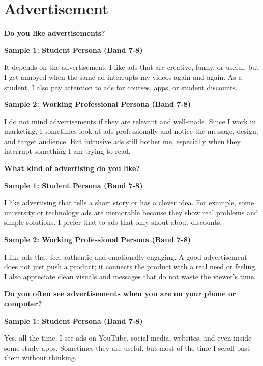 \newpage

\section{Advertisement}
\begin{ieltsquestion}
\textbf{Do you like advertisements?}
\end{ieltsquestion}
\textbf{Sample 1: Student Persona (Band 7-8)}

It depends on the advertisement. I like ads that are creative, funny, or useful, but I get annoyed when the same ad interrupts my videos again and again. As a student, I also pay attention to ads for courses, apps, or student discounts.

\textbf{Sample 2: Working Professional Persona (Band 7-8)}

I do not mind advertisements if they are relevant and well-made. Since I work in marketing, I sometimes look at ads professionally and notice the message, design, and target audience. But intrusive ads still bother me, especially when they interrupt something I am trying to read.

\separator

\begin{ieltsquestion}
\textbf{What kind of advertising do you like?}
\end{ieltsquestion}
\textbf{Sample 1: Student Persona (Band 7-8)}

I like advertising that tells a short story or has a clever idea. For example, some university or technology ads are memorable because they show real problems and simple solutions. I prefer that to ads that only shout about discounts.

\textbf{Sample 2: Working Professional Persona (Band 7-8)}

I like ads that feel authentic and emotionally engaging. A good advertisement does not just push a product; it connects the product with a real need or feeling. I also appreciate clean visuals and messages that do not waste the viewer's time.

\separator

\begin{ieltsquestion}
\textbf{Do you often see advertisements when you are on your phone or computer?}
\end{ieltsquestion}
\textbf{Sample 1: Student Persona (Band 7-8)}

Yes, all the time. I see ads on YouTube, social media, websites, and even inside some study apps. Sometimes they are useful, but most of the time I scroll past them without thinking.

